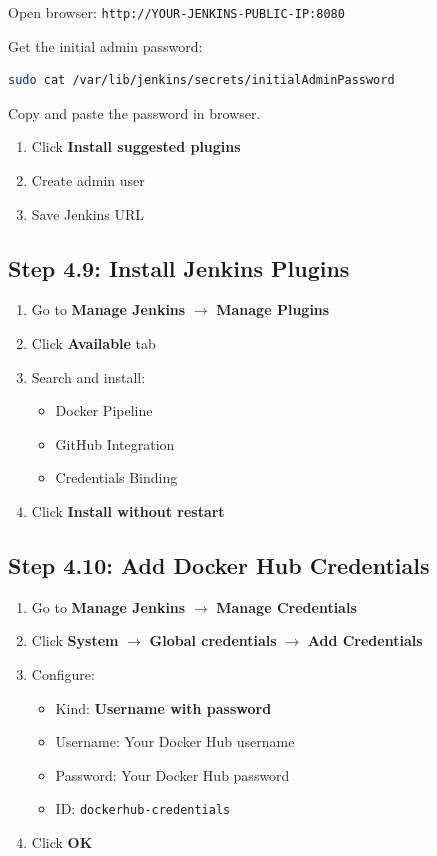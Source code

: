\documentclass[12pt,a4paper]{article}
\begin{document}
Open browser: \texttt{http://YOUR-JENKINS-PUBLIC-IP:8080}

Get the initial admin password:

\begin{lstlisting}[language=bash]
sudo cat /var/lib/jenkins/secrets/initialAdminPassword
\end{lstlisting}

Copy and paste the password in browser.

\begin{enumerate}
    \item Click \textbf{Install suggested plugins}
    \item Create admin user
    \item Save Jenkins URL
\end{enumerate}

\subsection{Step 4.9: Install Jenkins Plugins}

\begin{enumerate}
    \item Go to \textbf{Manage Jenkins} $\rightarrow$ \textbf{Manage Plugins}
    \item Click \textbf{Available} tab
    \item Search and install:
    \begin{itemize}
        \item Docker Pipeline
        \item GitHub Integration
        \item Credentials Binding
    \end{itemize}
    \item Click \textbf{Install without restart}
\end{enumerate}

\subsection{Step 4.10: Add Docker Hub Credentials}

\begin{enumerate}
    \item Go to \textbf{Manage Jenkins} $\rightarrow$ \textbf{Manage Credentials}
    \item Click \textbf{System} $\rightarrow$ \textbf{Global credentials} $\rightarrow$ \textbf{Add Credentials}
    \item Configure:
    \begin{itemize}
        \item Kind: \textbf{Username with password}
        \item Username: Your Docker Hub username
        \item Password: Your Docker Hub password
        \item ID: \texttt{dockerhub-credentials}
    \end{itemize}
    \item Click \textbf{OK}
\end{enumerate}
\end{document}
